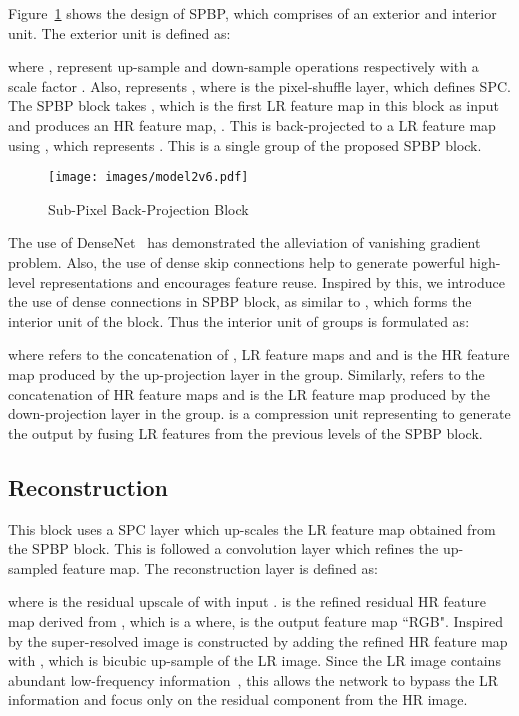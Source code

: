 \documentclass[a4paper,11pt]{article}
\begin{document}
Figure~\ref{fig:SPBP} shows the design of SPBP, which comprises of an exterior and interior unit.
The exterior unit is defined as:
  
 where ,  represent up-sample and down-sample operations respectively with a scale factor . Also,  represents , where  is the pixel-shuffle layer, which defines SPC. The SPBP block takes , which is the first LR feature map in this block as input and produces an HR feature map, . This is back-projected to a LR feature map  using , which represents . This is a single group of the proposed SPBP block. 
 






\begin{figure}[ht]
     \centering
     \texttt{[image: images/model2v6.pdf]}
\caption{ Sub-Pixel Back-Projection Block }
\label{fig:SPBP}
\end{figure}

The use of DenseNet~\cite{densenet} has demonstrated the alleviation of vanishing gradient problem. Also, the use of dense skip connections help to generate powerful high-level representations and encourages feature reuse. Inspired by this, we introduce the use of dense connections in SPBP block, as similar to \cite{DBPN}, which forms the interior unit of the block. Thus the interior unit of  groups is formulated as:



where  refers to the concatenation of , LR feature maps  and   and is the HR feature map produced by the up-projection layer in the  group. Similarly,  refers to the concatenation of HR feature maps   and   is the LR feature map produced by the down-projection layer in the  group.  is a compression unit representing  to generate the output  by fusing LR features from the previous levels  of the SPBP block.




\subsection{Reconstruction}
This block uses a SPC layer which up-scales the LR feature map obtained from the SPBP block. This is followed a convolution layer which refines the up-sampled feature map. The reconstruction layer is defined as:
  
   
where  is the residual upscale of  with input .  is the refined residual HR feature map derived from , which is  a  where,  is the output feature map ``RGB". Inspired by \cite{nvidiagwmt, SRFBN} the super-resolved image is constructed by adding the refined HR feature map with , which is bicubic up-sample of the LR image. Since the LR image contains abundant low-frequency information~\cite{RCAN}, this allows the network to bypass the LR information and focus only on the residual component from the HR image.
\end{document}
